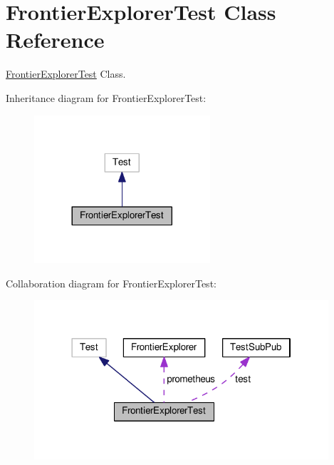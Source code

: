 \hypertarget{classFrontierExplorerTest}{}\section{Frontier\+Explorer\+Test Class Reference}
\label{classFrontierExplorerTest}


\hyperlink{classFrontierExplorerTest}{Frontier\+Explorer\+Test} Class.  




Inheritance diagram for Frontier\+Explorer\+Test\+:
\nopagebreak
\begin{figure}[H]
\begin{center}
\leavevmode
\includegraphics[width=185pt]{classFrontierExplorerTest__inherit__graph}
\end{center}
\end{figure}


Collaboration diagram for Frontier\+Explorer\+Test\+:
\nopagebreak
\begin{figure}[H]
\begin{center}
\leavevmode
\includegraphics[width=310pt]{classFrontierExplorerTest__coll__graph}
\end{center}
\end{figure}
